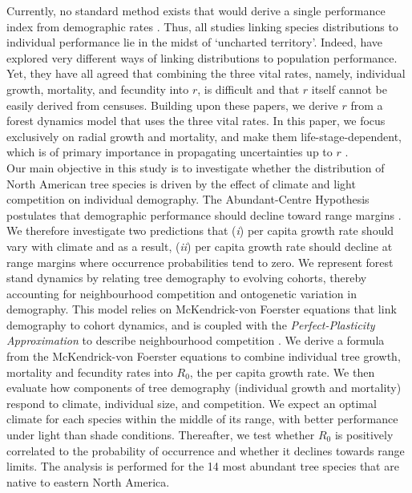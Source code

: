 Currently, no standard method exists that would derive a single performance index from demographic rates \citep{Purves2009}. Thus, all studies linking species distributions to individual performance lie in the midst of `uncharted territory'. Indeed, \cite{McGill2012, Thuiller2014, Pagel2012} have explored very different ways of linking distributions to population performance. Yet, they have all agreed that combining the three vital rates, namely, individual growth, mortality, and fecundity into $ r $, is difficult and that $ r $ itself cannot be easily derived from censuses. Building upon these papers, we derive $ r $ from a forest dynamics model that uses the three vital rates. In this paper, we focus exclusively on radial growth and mortality, and make them life-stage-dependent, which is of primary importance in propagating uncertainties up to $ r $ \citep[$ \lambda $ in his article]{Clark2003b}. \\

Our main objective in this study is to investigate whether the distribution of North American tree species is driven by the effect of climate and light competition on individual demography. The Abundant-Centre Hypothesis postulates that demographic performance should decline toward range margins \citep{Sagarin2002}. We therefore investigate two predictions that (\textit{i}) per capita growth rate should vary with climate and as a result, (\textit{ii}) per capita growth rate should decline at range margins where occurrence probabilities tend to zero. We represent forest stand dynamics by relating tree demography to evolving cohorts, thereby accounting for neighbourhood competition and ontogenetic variation in demography. This model relies on McKendrick-von Foerster equations that link demography to cohort dynamics, and is coupled with the \textit{Perfect-Plasticity Approximation} to describe neighbourhood competition \citep{Strigul2008}. We derive a formula from the McKendrick-von Foerster equations to combine individual tree growth, mortality and fecundity rates into $ R_0 $, \ie the per capita growth rate. We then evaluate how components of tree demography (individual growth and mortality) respond to climate, individual size, and competition. We expect an optimal climate for each species within the middle of its range, with better performance under light than shade conditions. Thereafter, we test whether $ R_0 $ is positively correlated to the probability of occurrence and whether it declines towards range limits. The analysis is performed for the 14 most abundant tree species that are native to eastern North America.